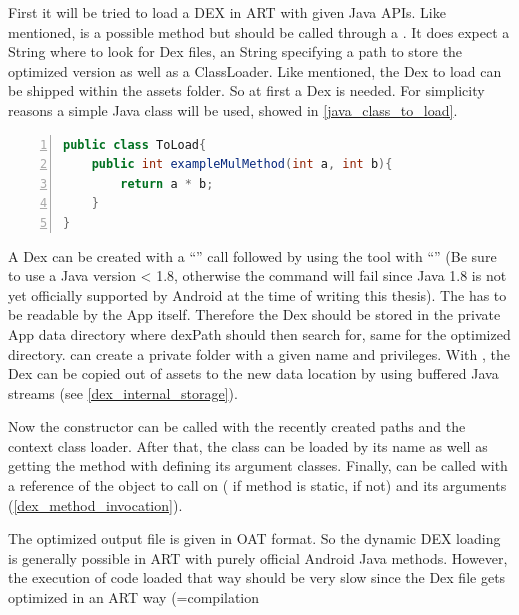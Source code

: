 First it will be tried to load a DEX in ART with given Java APIs.
Like mentioned,  is a possible method but should be called
through a . It does expect a  String where to look for Dex files, an  String specifying a path to store the optimized version as well as a  ClassLoader.
Like mentioned, the Dex to load can be shipped within the assets folder.
So at first a Dex is needed. For simplicity reasons a simple Java class will be used, showed in \autoref{java_class_to_load}.
\begin{lstlisting}[language=Java, caption=Java Class to load, label=java_class_to_load, numbers=left]
public class ToLoad{
    public int exampleMulMethod(int a, int b){
        return a * b;
    }
}
\end{lstlisting}
A Dex can be created with a ``'' call followed by
using the  tool with ``'' (Be sure to use a Java version < 1.8, otherwise the 
command will fail since Java 1.8 is not yet officially supported by Android at the time
of writing this thesis).
The  has to be readable by the App itself. Therefore
the Dex should be stored in the private App data directory where dexPath should then
search for, same for the optimized directory.
 can create a private folder with a given name
and privileges. With , the Dex can be
copied out of assets to the new data location by using buffered Java streams (see \autoref{dex_internal_storage}).

Now the  constructor can be called with the recently
created paths and the context class loader. After that, the class can be loaded
by its name as well as getting the method with defining its argument classes.
Finally,  can be called with a reference of the object to call
on ( if method is static,  if not) and its
arguments (\autoref{dex_method_invocation}).

The optimized output file is given in OAT format.
So the dynamic DEX loading is generally possible in ART with purely official
Android Java methods. However, the execution of code loaded that way should
be very slow since the Dex file gets optimized in an ART way (=compilation
